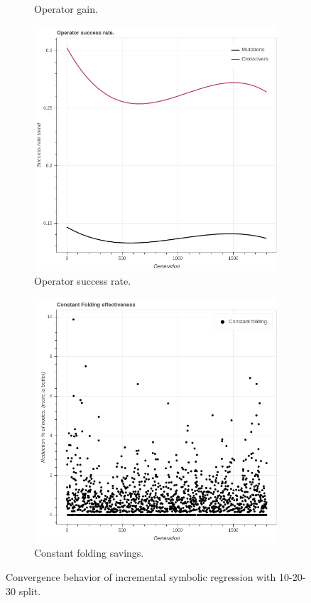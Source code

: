 \begin{figure}
\begin{subfigure}{0.6\textwidth}
        \caption{Operator gain.}
    \end{subfigure}
        \begin{subfigure}{0.6\textwidth}
        \includegraphics[width=0.8\linewidth]{figures/incrementaloperatorsuccessrate30s.png}
        \caption{Operator success rate.}
    \end{subfigure}
    \begin{subfigure}{0.6\textwidth}
        \includegraphics[width=0.8\linewidth]{figures/incrementalconstfolding30s.png}
        \caption{Constant folding savings.}
    \end{subfigure}
    \caption{Convergence behavior of incremental symbolic regression with 10-20-30 split.}
    \label{fig:incrementalseededconvergence}
\end{figure}
